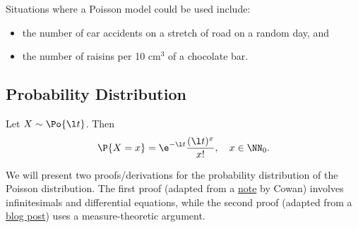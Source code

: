 Situations where a Poisson model could be used include:
\begin{itemize}
    \item the number of car accidents on a stretch of road on a random day, and
    \item the number of raisins per 10 cm$^3$ of a chocolate bar.
\end{itemize}

\subsection{Probability Distribution}

\begin{proposition}
    Let $X \sim \Po{\l t}$. Then \[\P{X = x} = \e^{-\l t} \frac{(\l t)^x}{x!}, \quad x \in \NN_{0}.\]
\end{proposition}
We will present two proofs/derivations for the probability distribution of the Poisson distribution. The first proof (adapted from a \href{https://www.pp.rhul.ac.uk/~cowan/stat/notes/PoissonNote.pdf}{note} by Cowan) involves infinitesimals and differential equations, while the second proof (adapted from a \href{https://blog.kalculate.ai/2024/03/27/poisson-distribution/}{blog post}) uses a measure-theoretic argument.
